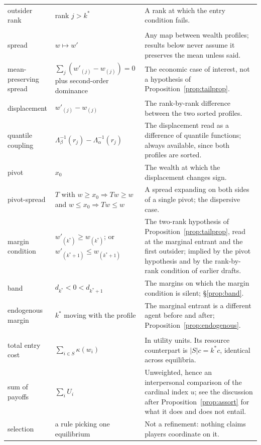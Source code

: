 \documentclass[11pt]{article}
\begin{document}
\begin{longtable}{@{}>{\raggedright\arraybackslash}p{}>{\raggedright\arraybackslash}p{}>{\raggedright\arraybackslash}p{}@{}}
outsider rank & rank $j>k^*$ & A rank at which the entry condition fails. \\[4pt]
\multicolumn{3}{@{}l}{\emph{Comparative statics}}\\[2pt]
spread & $w\mapsto w'$ & Any map between wealth profiles; results below
  never assume it preserves the mean unless said. \\
mean-preserving spread & $\sum_j(w'_{(j)}-w_{(j)})=0$ plus
  second-order dominance & The economic case of interest, not a hypothesis
  of Proposition~\ref{prop:tailprop}. \\
displacement & $w'_{(j)}-w_{(j)}$ & The rank-by-rank difference between the
  two sorted profiles. \\
quantile coupling & $\Lambda_\beta^{-1}(r_j)-\Lambda_\alpha^{-1}(r_j)$ &
  The displacement read as a difference of quantile functions; always
  available, since both profiles are sorted. \\
pivot & $x_0$ & The wealth at which the displacement changes sign. \\
pivot-spread & $T$ with $w\ge x_0\Rightarrow Tw\ge w$ and
  $w\le x_0\Rightarrow Tw\le w$ & A spread expanding on both sides of a
  single pivot; the dispersive case. \\
margin condition & $w'_{(k^*)}\ge w_{(k^*)}$; or
  $w'_{(k^*+1)}\le w_{(k^*+1)}$ & The two-rank hypothesis of
  Proposition~\ref{prop:tailprop}, read at the marginal entrant and the first
  outsider; implied by the pivot hypothesis and by the rank-by-rank condition
  of earlier drafts. \\
band & $d_{k^*}<0<d_{k^*+1}$ & The margins on which the margin condition is
  silent; \S\ref{prop:band}. \\
endogenous margin & $k^*$ moving with the profile & The marginal entrant is
  a different agent before and after; Proposition~\ref{prop:endogenous}. \\[4pt]
\multicolumn{3}{@{}l}{\emph{Aggregates}}\\[2pt]
total entry cost & $\sum_{i\in S}\kappa(w_i)$ & In utility units. Its
  resource counterpart is $|S|c=k^*c$, identical across equilibria. \\
sum of payoffs & $\sum_i U_i$ & Unweighted, hence an interpersonal
  comparison of the cardinal index $u$; see the discussion after
  Proposition~\ref{prop:assort} for what it does and does not entail. \\
selection & a rule picking one equilibrium & Not a refinement: nothing
  claims players coordinate on it. \\
\bottomrule
\end{longtable}
\end{document}
